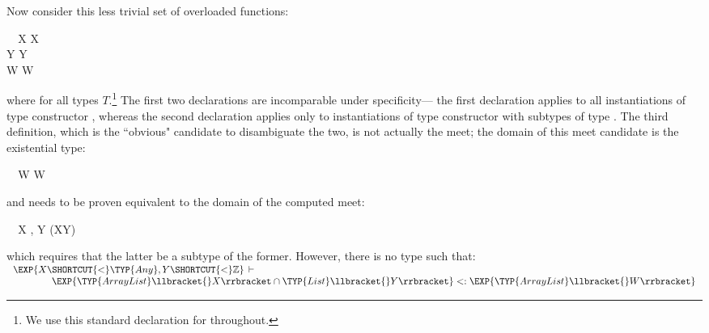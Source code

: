 Now consider this less trivial set of overloaded functions:
\begin{FortressCode}
{\tt ~~}\+\llbracket{}X \SHORTCUT{<} \rrbracket{}\llbracket{}X\rrbracket\COLON{} \\
  \llbracket{}Y\mathord{\SHORTCUT{<}}\: \rrbracket{}\llbracket{}Y\rrbracket\COLON{} \\
  \llbracket{}W\mathord{\SHORTCUT{<}}\: \rrbracket{}\llbracket{}W\rrbracket\COLON{}\-
\end{FortressCode}
where  for all types $T$.\footnote{We use this standard declaration for  throughout.}
The first two declarations are incomparable under specificity---%
the first declaration applies to all instantiations of type constructor ,
whereas the second declaration applies only to instantiations of
type constructor  with subtypes of type . The third definition,
which is the ``obvious" candidate to disambiguate the two, is not actually the meet;
the domain of this meet candidate is the existential type:
\begin{FortressCode}
{\tt ~~}\+\exists\llbracket{}W \SHORTCUT{<} \rrbracket{}\llbracket{}W\rrbracket\-
\end{FortressCode}
and needs to be proven equivalent to the domain of the computed meet:
\begin{FortressCode}
{\tt ~~}\+\exists\llbracket{}X \SHORTCUT{<} , Y \SHORTCUT{<} \rrbracket\bigl(\llbracket{}X\rrbracket \cap {}\llbracket{}Y\rrbracket\bigr)\-
\end{FortressCode}
which requires that the latter be a subtype of the former.
However, there is no type  such that:
\\[.5em]
\hspace*{.5em}
\ensuremath{
\begin{array}{l}
{\EXP{X \SHORTCUT{<} \TYP{Any}, Y \SHORTCUT{<} \mathbb{Z}}}\,\vdash
\\
\quad\quad\quad\quad
{\EXP{\TYP{ArrayList}\llbracket{}X\rrbracket \cap \TYP{List}\llbracket{}Y\rrbracket}}\;{\subtypeof}\;{\EXP{\TYP{ArrayList}\llbracket{}W\rrbracket}}
\end{array}
}
